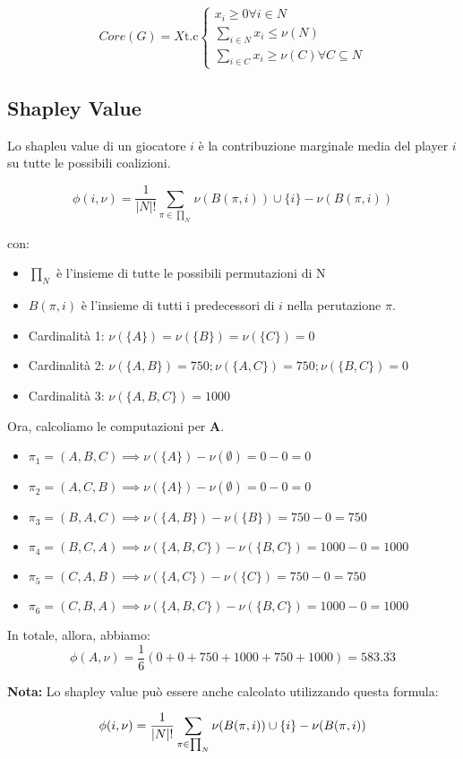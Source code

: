 \begin{equation}
    Core(G) = X \text{t.c} \begin{cases}
        x_i \geq 0 \forall i \in N     \\
        \sum_{i \in N} x_i \leq \nu(N) \\
        \sum_{i \in C} x_i \geq \nu(C) \forall C \subseteq N
    \end{cases}
\end{equation}


\subsection{Shapley Value}

Lo shapleu value di un giocatore $i$ è la contribuzione marginale media del
player $i$ su tutte le possibili coalizioni.

\begin{equation}
    \phi(i,\nu) = \frac{1}{|N|!} \sum_{\pi \in \prod_N} \nu(B(\pi, i)) \cup \{i\} - \nu(B(\pi, i))
\end{equation}

con:
\begin{itemize}
    \item $\prod_N$ è l'insieme di tutte le possibili permutazioni di N
    \item $B(\pi, i)$ è l'insieme di tutti i predecessori di $i$ nella perutazione $\pi$.
\end{itemize}

\begin{esempio}
\end{esempio}

\begin{itemize}
    \item Cardinalità 1: $\nu(\{A\}) = \nu(\{B\}) = \nu(\{C\}) = 0$
    \item Cardinalità 2: $\nu(\{A,B\}) = 750; \nu(\{A,C\}) = 750; \nu(\{B,C\}) = 0$
    \item Cardinalità 3: $\nu(\{A,B,C\}) = 1000$
\end{itemize}

Ora, calcoliamo le computazioni per \textbf{A}.

\begin{itemize}
    \item $\pi_1 = (A,B,C) \implies \nu(\{A\}) - \nu(\emptyset) = 0-0 = 0$
    \item $\pi_2 = (A,C,B) \implies \nu(\{A\}) - \nu(\emptyset) = 0-0 = 0$
    \item $\pi_3 = (B,A,C) \implies \nu(\{A,B\}) - \nu(\{B\}) = 750-0 = 750$
    \item $\pi_4 = (B,C,A) \implies \nu(\{A,B,C\})  - \nu(\{B,C\}) = 1000-0 = 1000$
    \item $\pi_5 = (C,A,B) \implies \nu(\{A,C\}) - \nu(\{C\}) = 750-0 = 750$
    \item $\pi_6 = (C,B,A) \implies \nu(\{A,B,C\}) - \nu(\{B,C\}) = 1000-0 = 1000$
\end{itemize}

In totale, allora, abbiamo:
\[
    \phi(A,\nu) = \frac{1}{6}(0+0+750+1000+750+1000) = 583.\overline{33}
\]

\textbf{Nota:} Lo shapley value può essere anche calcolato utilizzando questa formula:

\[
    \phi(i,\nu) = \frac{1}{|N|!} \sum_{\pi \in \prod_N} \nu(B(\pi, i)) \cup \{i\} - \nu(B(\pi, i))
\]

\newpage
